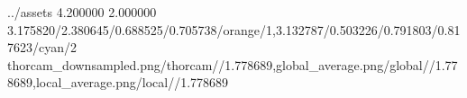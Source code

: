 \TrioComparisonFigure
    {../assets}
    {4.200000}
    {2.000000}
    {3.175820/2.380645/0.688525/0.705738/orange/1,3.132787/0.503226/0.791803/0.817623/cyan/2}
    {thorcam_downsampled.png/thorcam//1.778689,global_average.png/global//1.778689,local_average.png/local//1.778689}

